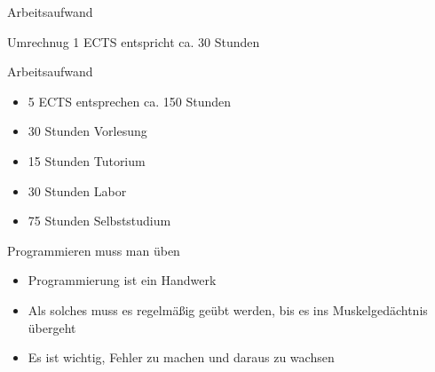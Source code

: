 \documentclass[xelatex,aspectratio=168]{beamer}
\begin{document}
\begin{frame}{Arbeitsaufwand}
  \begin{exampleblock}{Umrechnug}
    1 ECTS entspricht ca. 30 Stunden
  \end{exampleblock}
  \begin{block}{Arbeitsaufwand}
    \begin{itemize}
      \item 5 ECTS entsprechen ca. 150 Stunden
      \item 30 Stunden Vorlesung
      \item 15 Stunden Tutorium
      \item 30 Stunden Labor
      \item 75 Stunden Selbststudium
    \end{itemize}
  \end{block}
  \begin{alertblock}{Programmieren muss man üben}
    \begin{itemize}
      \item Programmierung ist ein Handwerk
      \item Als solches muss es regelmäßig geübt werden, bis es ins Muskelgedächtnis übergeht
      \item Es ist wichtig, Fehler zu machen und daraus zu wachsen
    \end{itemize}
  \end{alertblock}

\end{frame}
\end{document}
